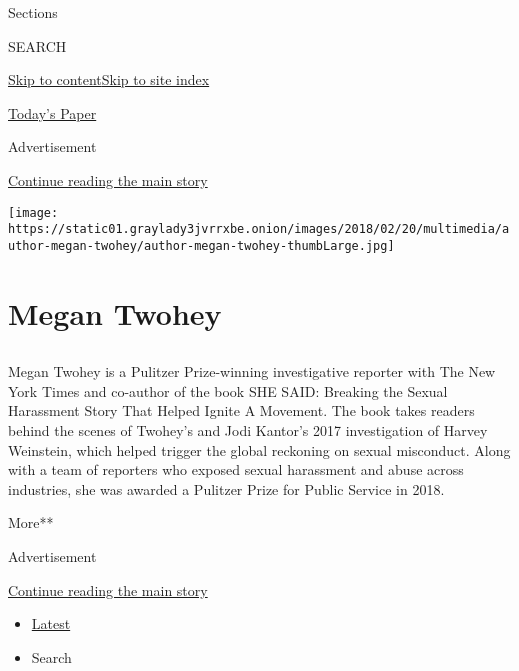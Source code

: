 Sections

SEARCH

\protect\hyperlink{site-content}{Skip to
content}\protect\hyperlink{site-index}{Skip to site index}

\href{https://myaccount.nytimes3xbfgragh.onion/auth/login?response_type=cookie\&client_id=vi}{}

\href{https://www.nytimes3xbfgragh.onion/section/todayspaper}{Today's
Paper}

Advertisement

\protect\hyperlink{after-top}{Continue reading the main story}

\texttt{[image: https://static01.graylady3jvrrxbe.onion/images/2018/02/20/multimedia/author-megan-twohey/author-megan-twohey-thumbLarge.jpg]}

\hypertarget{megan-twohey}{%
\section{Megan Twohey}\label{megan-twohey}}

\subsection{}

Megan Twohey is a Pulitzer Prize-winning investigative reporter with The
New York Times and co-author of the book SHE SAID: Breaking the Sexual
Harassment Story That Helped Ignite A Movement. The book takes readers
behind the scenes of Twohey's and Jodi Kantor's 2017 investigation of
Harvey Weinstein, which helped trigger the global reckoning on sexual
misconduct. Along with a team of reporters who exposed sexual harassment
and abuse across industries, she was awarded a Pulitzer Prize for Public
Service in 2018.

More**

Advertisement

\protect\hyperlink{after-mid1}{Continue reading the main story}

\begin{itemize}
\tightlist
\item
  \protect\hyperlink{stream-panel}{Latest}
\item
  Search
\end{itemize}

